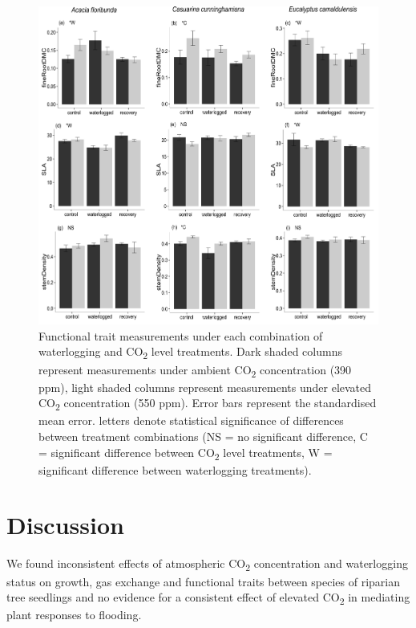 \documentclass[12pt,a4paper]{memoir}
\begin{document}
\begin{figure}[h!t]
\begin{center}
\includegraphics[width=\linewidth,keepaspectratio=true]{Ch5traits2.png} %
\caption[Functional trait measurements under each combination of waterlogging and CO\textsubscript{2} level treatments.]{\small{Functional trait measurements under each combination of waterlogging and CO\textsubscript{2} level treatments. Dark shaded columns represent measurements under ambient CO\textsubscript{2} concentration (390 ppm), light shaded columns represent measurements under elevated CO\textsubscript{2} concentration (550 ppm). Error bars represent the standardised mean error. \newline* letters denote statistical significance of differences between treatment combinations (NS = no significant difference, C = significant difference between CO\textsubscript{2} level treatments, W = significant difference between waterlogging treatments).}} %
\label{fig:Ch5_F3} %
\end{center}
\end{figure}

\section{Discussion}
We found inconsistent effects of atmospheric CO\textsubscript{2} concentration and waterlogging status on growth, gas exchange and functional traits between species of riparian tree seedlings and no evidence for a consistent effect of elevated CO\textsubscript{2} in mediating plant responses to flooding. 
\end{document}
